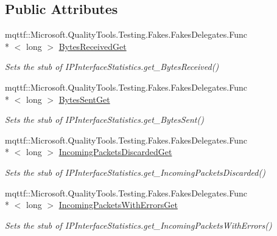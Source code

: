 \subsection*{Public Attributes}
\begin{DoxyCompactItemize}
\item 
mqttf\-::\-Microsoft.\-Quality\-Tools.\-Testing.\-Fakes.\-Fakes\-Delegates.\-Func\\*
$<$ long $>$ \hyperlink{class_system_1_1_net_1_1_network_information_1_1_fakes_1_1_stub_i_p_interface_statistics_a34ad7a869bd8be09a0e51015436ddfaf}{Bytes\-Received\-Get}
\begin{DoxyCompactList}\small\item\em Sets the stub of I\-P\-Interface\-Statistics.\-get\-\_\-\-Bytes\-Received()\end{DoxyCompactList}\item 
mqttf\-::\-Microsoft.\-Quality\-Tools.\-Testing.\-Fakes.\-Fakes\-Delegates.\-Func\\*
$<$ long $>$ \hyperlink{class_system_1_1_net_1_1_network_information_1_1_fakes_1_1_stub_i_p_interface_statistics_af04c37eae45a855df545e87c64bf0b37}{Bytes\-Sent\-Get}
\begin{DoxyCompactList}\small\item\em Sets the stub of I\-P\-Interface\-Statistics.\-get\-\_\-\-Bytes\-Sent()\end{DoxyCompactList}\item 
mqttf\-::\-Microsoft.\-Quality\-Tools.\-Testing.\-Fakes.\-Fakes\-Delegates.\-Func\\*
$<$ long $>$ \hyperlink{class_system_1_1_net_1_1_network_information_1_1_fakes_1_1_stub_i_p_interface_statistics_a2370a299f427e3f7dd7275a943e274dc}{Incoming\-Packets\-Discarded\-Get}
\begin{DoxyCompactList}\small\item\em Sets the stub of I\-P\-Interface\-Statistics.\-get\-\_\-\-Incoming\-Packets\-Discarded()\end{DoxyCompactList}\item 
mqttf\-::\-Microsoft.\-Quality\-Tools.\-Testing.\-Fakes.\-Fakes\-Delegates.\-Func\\*
$<$ long $>$ \hyperlink{class_system_1_1_net_1_1_network_information_1_1_fakes_1_1_stub_i_p_interface_statistics_aa4e3d6717d384a0dd769e0aa341fb014}{Incoming\-Packets\-With\-Errors\-Get}
\begin{DoxyCompactList}\small\item\em Sets the stub of I\-P\-Interface\-Statistics.\-get\-\_\-\-Incoming\-Packets\-With\-Errors()\end{DoxyCompactList}\item 

\end{DoxyCompactItemize}
